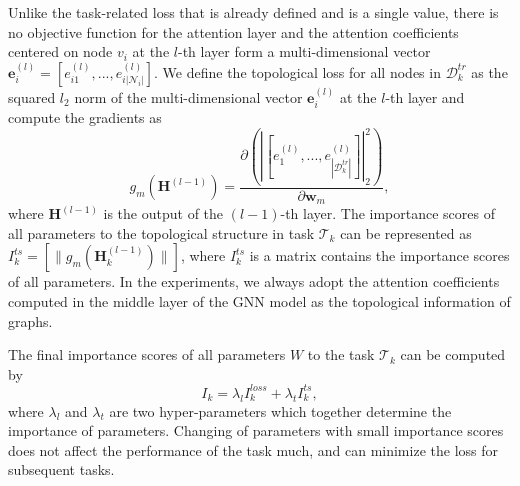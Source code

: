 \documentclass[letterpaper]{article} %
\begin{document}
Unlike the task-related loss that is already defined and is a single value,
there is no objective function for the attention layer and 
the attention coefficients centered on node $v_i$ at the $l$-th layer form a multi-dimensional vector $\boldsymbol{e}_i^{(l)} =[ e_{i1}^{(l)},..., e_{i |\mathcal{N}_i |}^{(l)}]$.  %
We define the topological loss for all nodes in $\mathcal{D}_k^{tr}$ as the squared $l_2$ norm of the multi-dimensional vector $\boldsymbol{e}_i^{(l)}$ at the $l$-th layer
and compute the gradients as
\begin{equation}
\label{vi}
  g_m(\boldsymbol{H}^{(l-1)})=\frac{\partial \left ( \left| [e_1^{(l)},...,e_{|\mathcal{D}_k^{tr}|}^{(l)}] \right |_2^2 \right ) }{\partial{\boldsymbol{w}_m}},
\end{equation}
\noindent 
where $\boldsymbol{H}^{(l-1)}$ is the output of the $(l-1)$-th layer. 
The importance scores of all parameters 
to the topological structure in task $\mathcal{T}_k$ 
can be represented as 
$I_{k}^{ts}=[ \|g_m(\boldsymbol{H}_k^{(l-1)}) \|]$, 
where $I_{k}^{ts}$ is a matrix contains the importance scores of all parameters.
In the experiments, we always adopt the attention coefficients 
computed in the middle layer of the GNN model
as the topological information of graphs.

The final importance scores of all parameters $W$ to the task $\mathcal{T}_k$ can be computed by
\begin{equation}
\label{Ik}
    I_k =\lambda_l I_{k}^{loss} + \lambda_t I_k^{ts},
\end{equation}
\noindent where $\lambda_l$ and $\lambda_t$ are two hyper-parameters which together determine the importance of parameters.
Changing of parameters with small importance scores 
does not affect the performance of the task much, 
and can minimize the loss for subsequent tasks.

\end{document}
